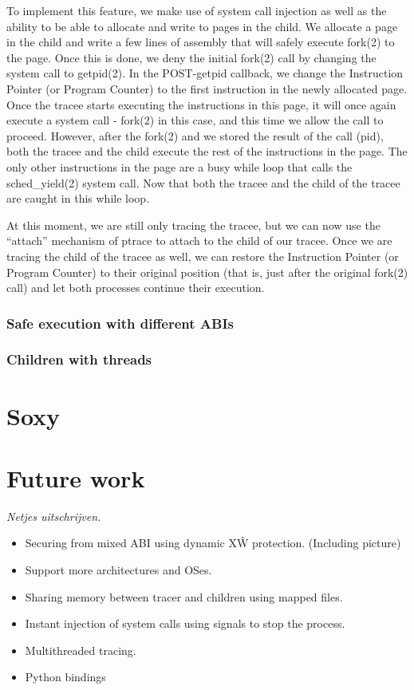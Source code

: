 \documentclass[a4paper, twoside, 10pt, twocolumn]{report}
\begin{document}
To implement this feature, we make use of system call injection as well as the
ability to be able to allocate and write to pages in the child. We allocate a
page in the child and write a few lines of assembly that will safely execute
fork(2) to the page. Once this is done, we deny the initial fork(2) call by
changing the system call to getpid(2). In the POST-getpid callback, we change
the Instruction Pointer (or Program Counter) to the first instruction in the
newly allocated page. Once the tracee starts executing the instructions in this
page, it will once again execute a system call - fork(2) in this case, and this
time we allow the call to proceed. However, after the fork(2) and we stored the
result of the call (pid), both the tracee and the child execute the rest of the
instructions in the page. The only other instructions in the page are a busy
while loop that calls the sched\_yield(2) system call. Now that both the tracee
and the child of the tracee are caught in this while loop.

At this moment, we are still only tracing the tracee, but we can now use the
``attach'' mechanism of ptrace to attach to the child of our tracee. Once we are
tracing the child of the tracee as well, we can restore the Instruction Pointer
(or Program Counter) to their original position (that is, just after the
original fork(2) call) and let both processes continue their execution.


\subsection{Safe execution with different ABIs}

%

\subsection{Children with threads}




\chapter{Soxy}

\chapter{Future work}

\textit{Netjes uitschrijven.}
\begin{itemize}
    \item Securing from mixed ABI using dynamic X\^W protection. (Including
        picture)
    \item Support more architectures and OSes.
    \item Sharing memory between tracer and children using mapped files.
    \item Instant injection of system calls using signals to stop the process.
    \item Multithreaded tracing.
    \item Python bindings
\end{itemize}
\end{document}
